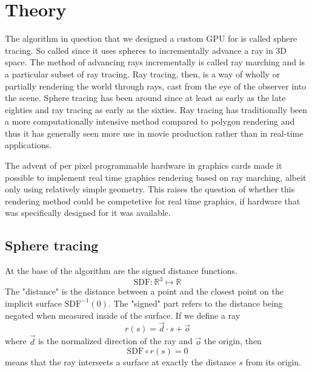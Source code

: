 \chapter{Theory}

	The algorithm in question that we designed a custom GPU for is called
	sphere tracing.\cite{Hart1996} So called since it uses spheres to
	incrementally advance a ray in 3D space. The method of advancing rays
	incrementally is called ray marching and is a particular subset of ray
	tracing.\cite{Whitted1980} Ray tracing, then, is a way of wholly or
	partially rendering the world through rays, cast from the eye of the
	observer into the scene.  Sphere tracing has been around since at least as
	early as the late eighties and ray tracing as early as the
	sixties.\cite{Hart1989,Appel1968} Ray tracing has traditionally been a more
	computationally intensive method compared to polygon
	rendering\cite{Wylie1967} and thus it has generally seen more use in movie
	production rather than in real-time applications.\cite{ref_needed?} 
	
	
	The advent of per pixel programmable hardware in graphics cards made it
	possible to implement real time graphics rendering based on ray marching, 
	albeit only using relatively simple geometry. This raises the question of 
	whether this rendering method could be competetive for real time graphics,
	if hardware that was specifically designed for it was available.
	
		
	\section{Sphere tracing} 
	
		\begin{minipage}{0.6\textwidth} 
		
			At the base of the algorithm are the signed distance functions.
			$$\text{SDF}:\mathbb{R}^{3}\mapsto\mathbb{R}$$ The "distance" is
			the distance between a point and the closest point on the implicit
			surface $\text{SDF}^{-1}(0)$. The "signed" part refers to the
			distance being negated when measured inside of the surface.  If we
			define a ray $$r(s) = \vec{d} \cdot s + \vec{o}$$ where $\vec{d}$
			is the normalized direction of the ray and $\vec{o}$ the origin,
			then $$\text{SDF}\circ r(s) = 0$$ means that the ray intersects a
			surface at exactly the distance $s$ from its origin.
		
		\end{minipage} 
		
